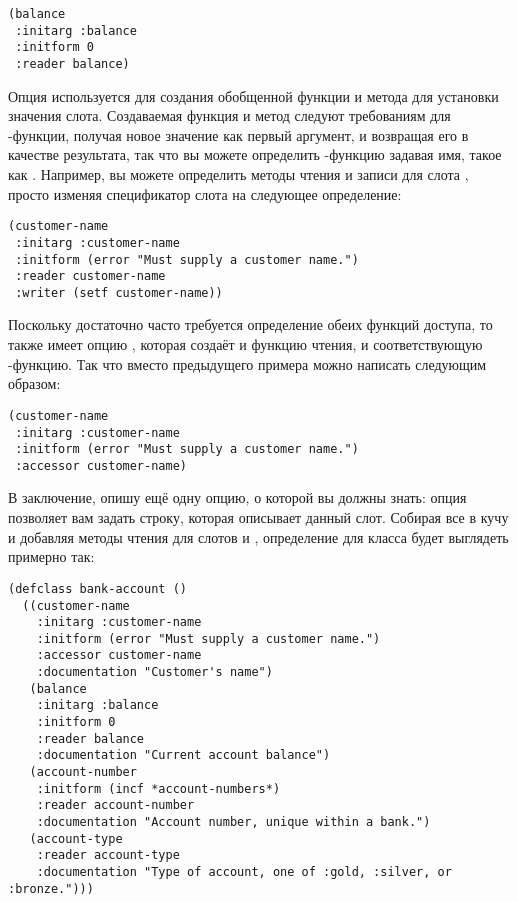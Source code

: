 \begin{lstlisting}
(balance
 :initarg :balance
 :initform 0
 :reader balance)
\end{lstlisting}

Опция  используется для создания обобщенной функции и метода для установки
значения слота.  Создаваемая функция и метод следуют требованиям для -функции,
получая новое значение как первый аргумент, и возвращая его в качестве результата, так что
вы можете определить -функцию задавая имя, такое как .  Например, вы можете определить методы чтения и записи для слота
, просто изменяя спецификатор слота на следующее определение:

\begin{lstlisting}
(customer-name
 :initarg :customer-name
 :initform (error "Must supply a customer name.")
 :reader customer-name
 :writer (setf customer-name))
\end{lstlisting}

Поскольку достаточно часто требуется определение обеих функций доступа, то 
также имеет опцию , которая создаёт и функцию чтения, и соответствующую
-функцию.  Так что вместо предыдущего примера можно написать следующим образом:

\begin{lstlisting}
(customer-name
 :initarg :customer-name
 :initform (error "Must supply a customer name.")
 :accessor customer-name)
\end{lstlisting}

В заключение, опишу ещё одну опцию, о которой вы должны знать: опция 
позволяет вам задать строку, которая описывает данный слот.  Собирая все в кучу и добавляя
методы чтения для слотов  и , определение
 для класса  будет выглядеть примерно так:

\begin{lstlisting}
(defclass bank-account ()
  ((customer-name
    :initarg :customer-name
    :initform (error "Must supply a customer name.")
    :accessor customer-name
    :documentation "Customer's name")
   (balance
    :initarg :balance
    :initform 0
    :reader balance
    :documentation "Current account balance")
   (account-number
    :initform (incf *account-numbers*)
    :reader account-number
    :documentation "Account number, unique within a bank.")
   (account-type
    :reader account-type
    :documentation "Type of account, one of :gold, :silver, or :bronze.")))
\end{lstlisting}


